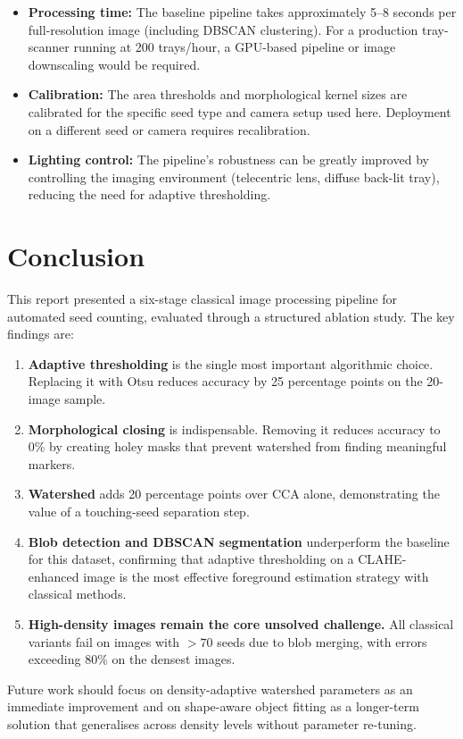 \documentclass[12pt,a4paper]{article}
\begin{document}
\begin{itemize}
    \item \textbf{Processing time:} The baseline pipeline takes approximately
          5--8 seconds per full-resolution image (including DBSCAN clustering).
          For a production tray-scanner running at 200 trays/hour, a GPU-based
          pipeline or image downscaling would be required.
    \item \textbf{Calibration:} The area thresholds and morphological kernel
          sizes are calibrated for the specific seed type and camera setup used
          here. Deployment on a different seed or camera requires recalibration.
    \item \textbf{Lighting control:} The pipeline's robustness can be greatly
          improved by controlling the imaging environment (telecentric lens,
          diffuse back-lit tray), reducing the need for adaptive thresholding.
\end{itemize}

\newpage

\section{Conclusion}

This report presented a six-stage classical image processing pipeline for
automated seed counting, evaluated through a structured ablation study. The
key findings are:

\begin{enumerate}
    \item \textbf{Adaptive thresholding} is the single most important
          algorithmic choice. Replacing it with Otsu reduces accuracy by
          25 percentage points on the 20-image sample.
    \item \textbf{Morphological closing} is indispensable. Removing it
          reduces accuracy to 0\% by creating holey masks that prevent
          watershed from finding meaningful markers.
    \item \textbf{Watershed} adds 20 percentage points over CCA alone,
          demonstrating the value of a touching-seed separation step.
    \item \textbf{Blob detection and DBSCAN segmentation} underperform
          the baseline for this dataset, confirming that adaptive thresholding
          on a CLAHE-enhanced image is the most effective foreground estimation
          strategy with classical methods.
    \item \textbf{High-density images remain the core unsolved challenge.}
          All classical variants fail on images with $>70$ seeds due to blob
          merging, with errors exceeding 80\% on the densest images.

\end{enumerate}

Future work should focus on density-adaptive watershed parameters as an
immediate improvement and on shape-aware object fitting as a longer-term 
solution that generalises across density levels without parameter re-tuning.
\end{document}
